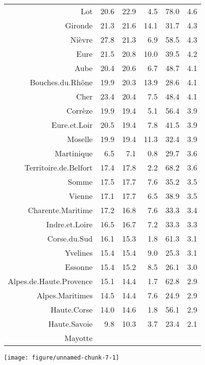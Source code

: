 \documentclass[11pt,a4paper]{article}\usepackage[]{graphicx}\usepackage[]{color}
\makeatletter
\def\maxwidth{ %
  \ifdim\Gin@nat@width>\linewidth
    \linewidth
  \else
    \Gin@nat@width
  \fi
}
\newenvironment{knitrout}{}{} %
\makeatother
\begin{document}
\begin{table}[H]
\begin{tabular}{rrrrrr}
  Lot & 20.6 & 22.9 & 4.5 & 78.0 & 4.6 \\ 
  Gironde & 21.3 & 21.6 & 14.1 & 31.7 & 4.3 \\ 
  Nièvre & 27.8 & 21.3 & 6.9 & 58.5 & 4.3 \\ 
  Eure & 21.5 & 20.8 & 10.0 & 39.5 & 4.2 \\ 
  Aube & 20.4 & 20.6 & 6.7 & 48.7 & 4.1 \\ 
  Bouches.du.Rhône & 19.9 & 20.3 & 13.9 & 28.6 & 4.1 \\ 
  Cher & 23.4 & 20.4 & 7.5 & 48.4 & 4.1 \\ 
  Corrèze & 19.9 & 19.4 & 5.1 & 56.4 & 3.9 \\ 
  Eure.et.Loir & 20.5 & 19.4 & 7.8 & 41.5 & 3.9 \\ 
  Moselle & 19.9 & 19.4 & 11.3 & 32.4 & 3.9 \\ 
  Martinique & 6.5 & 7.1 & 0.8 & 29.7 & 3.6 \\ 
  Territoire.de.Belfort & 17.4 & 17.8 & 2.2 & 68.2 & 3.6 \\ 
  Somme & 17.5 & 17.7 & 7.6 & 35.2 & 3.5 \\ 
  Vienne & 17.1 & 17.7 & 6.5 & 38.9 & 3.5 \\ 
  Charente.Maritime & 17.2 & 16.8 & 7.6 & 33.3 & 3.4 \\ 
  Indre.et.Loire & 16.5 & 16.7 & 7.2 & 33.3 & 3.3 \\ 
  Corse.du.Sud & 16.1 & 15.3 & 1.8 & 61.3 & 3.1 \\ 
  Yvelines & 15.4 & 15.4 & 9.0 & 25.3 & 3.1 \\ 
  Essonne & 15.4 & 15.2 & 8.5 & 26.1 & 3.0 \\ 
  Alpes.de.Haute.Provence & 15.1 & 14.4 & 1.7 & 62.8 & 2.9 \\ 
  Alpes.Maritimes & 14.5 & 14.4 & 7.6 & 24.9 & 2.9 \\ 
  Haute.Corse & 14.0 & 14.6 & 1.8 & 56.1 & 2.9 \\ 
  Haute.Savoie & 9.8 & 10.3 & 3.7 & 23.4 & 2.1 \\ 
  Mayotte &  &  &  &  &  \\ 
   \hline
\end{tabular}
\endgroup
\end{table}



\begin{knitrout}
\color{fgcolor}
\texttt{[image: figure/unnamed-chunk-7-1]} 

\end{knitrout}
\end{document}
